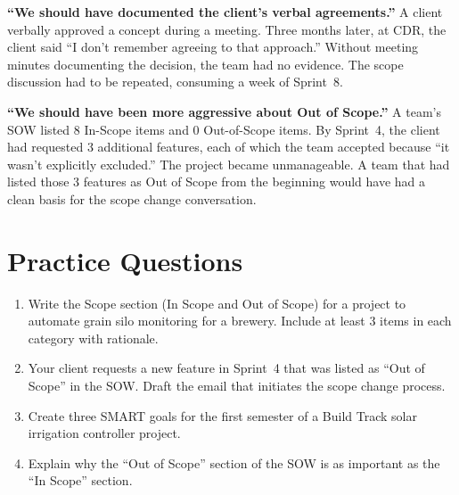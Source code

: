 \textbf{``We should have documented the client's verbal agreements.''} A client verbally approved a concept during a meeting. Three months later, at CDR, the client said ``I don't remember agreeing to that approach.'' Without meeting minutes documenting the decision, the team had no evidence. The scope discussion had to be repeated, consuming a week of Sprint~8.

\textbf{``We should have been more aggressive about Out of Scope.''} A team's SOW listed 8 In-Scope items and 0 Out-of-Scope items. By Sprint~4, the client had requested 3 additional features, each of which the team accepted because ``it wasn't explicitly excluded.'' The project became unmanageable. A team that had listed those 3 features as Out of Scope from the beginning would have had a clean basis for the scope change conversation.


\section{Practice Questions}
\begin{enumerate}[leftmargin=1.5em]
\item Write the Scope section (In Scope and Out of Scope) for a project to automate grain silo monitoring for a brewery. Include at least 3 items in each category with rationale.
\item Your client requests a new feature in Sprint~4 that was listed as ``Out of Scope'' in the SOW. Draft the email that initiates the scope change process.
\item Create three SMART goals for the first semester of a Build Track solar irrigation controller project.
\item Explain why the ``Out of Scope'' section of the SOW is as important as the ``In Scope'' section.
\end{enumerate}



